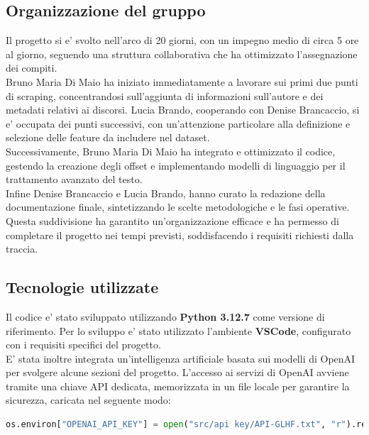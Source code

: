 \documentclass{article}
\begin{document}
	\subsection{Organizzazione del gruppo}
	Il progetto si e' svolto nell'arco di 20 giorni, con un impegno medio di circa 5 ore al giorno, seguendo una struttura collaborativa che ha ottimizzato l'assegnazione dei compiti. \\
	Bruno Maria Di Maio ha iniziato immediatamente a lavorare sui primi due punti di scraping, concentrandosi sull'aggiunta di informazioni sull'autore e dei metadati relativi ai discorsi. Lucia Brando, cooperando con Denise Brancaccio, si e' occupata dei punti successivi, con un'attenzione particolare alla definizione e selezione delle feature da includere nel dataset. \\
	Successivamente, Bruno Maria Di Maio ha integrato e ottimizzato il codice, gestendo la creazione degli offset e implementando modelli di linguaggio per il trattamento avanzato del testo.\\ Infine Denise Brancaccio e Lucia Brando, hanno curato la redazione della documentazione finale, sintetizzando le scelte metodologiche e le fasi operative.\\
	Questa suddivisione ha garantito un'organizzazione efficace e ha permesso di completare il progetto nei tempi previsti, soddisfacendo i requisiti richiesti dalla traccia.
	
	\subsection{Tecnologie utilizzate}
Il codice e' stato sviluppato utilizzando \textbf{Python 3.12.7} come versione di riferimento. Per lo sviluppo e' stato utilizzato l'ambiente \textbf{VSCode}, configurato con i requisiti specifici del progetto.\\
E' stata inoltre integrata un'intelligenza artificiale basata sui modelli di OpenAI per svolgere alcune sezioni del progetto. L'accesso ai servizi di OpenAI avviene tramite una chiave API dedicata, memorizzata in un file locale per garantire la sicurezza, caricata nel seguente modo:
	\begin{lstlisting}[language=python]
os.environ["OPENAI_API_KEY"] = open("src/api key/API-GLHF.txt", "r").read()
	\end{lstlisting}
	
\end{document}
